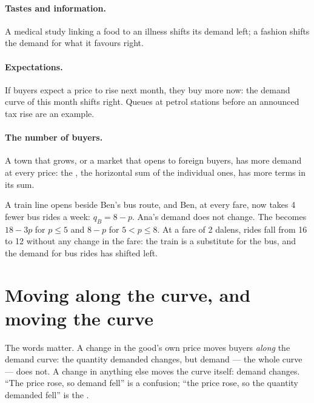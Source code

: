 \paragraph{Tastes and information.} A medical study linking a food to an illness shifts its demand left; a fashion shifts
the demand for what it favours right.

\paragraph{Expectations.} If buyers expect a price to rise next month, they buy more now: the demand curve of this month
shifts right. Queues at petrol stations before an announced tax rise are an example.

\paragraph{The number of buyers.} A town that grows, or a market that opens to foreign buyers, has more demand at every
price: the , the horizontal sum of the individual ones, has more terms in its sum.

\begin{example}\label{ex:g10:demand:rail}
A train line opens beside Ben's bus route, and Ben, at every fare, now takes 4 fewer bus rides a week: $q_B = 8 - p$. Ana's
demand does not change. The  becomes $18 - 3p$ for $p \le 5$ and $8 - p$ for $5 < p \le 8$. At a fare of 2 dalens,
rides fall from 16 to 12 without any change in the fare: the train is a substitute for the bus, and the demand for bus rides
has shifted left.
\end{example}

\section{Moving along the curve, and moving the curve}\label{sec:g10:demand:along}

The words matter. A change in the good's own price moves buyers \emph{along} the demand curve: the quantity demanded
changes, but demand --- the whole curve --- does not. A change in anything else moves the curve itself: demand changes.
``The price rose, so demand fell'' is a confusion; ``the price rose, so the quantity demanded fell'' is the .

